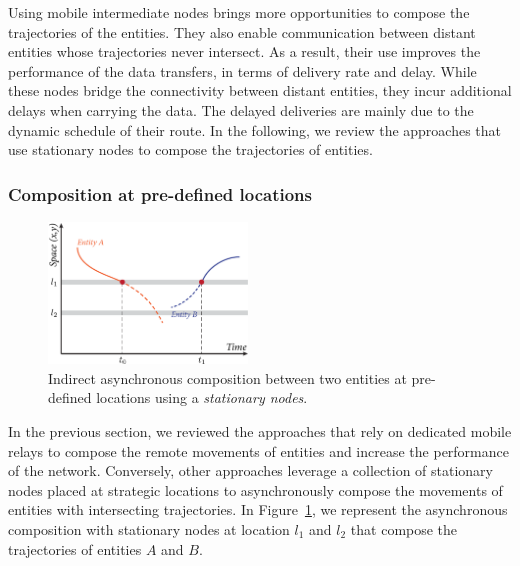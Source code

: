 Using mobile intermediate nodes brings more opportunities to compose the trajectories of the entities. They also enable communication between distant entities whose trajectories never intersect. As a result, their use improves the performance of the data transfers, in terms of delivery rate and delay. While these nodes bridge the connectivity between distant entities, they incur additional delays when carrying the data. The delayed deliveries are mainly due to the dynamic schedule of their route. In the following, we review the approaches that use stationary nodes to compose the trajectories of entities.

\clearpage
\subsubsection{Composition at pre-defined locations}
\label{sec:indirect-async-anchored}

\begin{figure}
    \vspace{-10pt}
    \includegraphics[width=5.3cm]{figures/dtn-indirect-async-geo.pdf}
    \caption{Indirect asynchronous composition between two entities at pre-defined locations using a \textit{stationary nodes}.}
    \label{fig:dtn-indirect-async-geo}
\end{figure}
In the previous section, we reviewed the approaches that rely on dedicated mobile relays to compose the remote movements of entities and increase the performance of the network. Conversely, other approaches leverage a collection of stationary nodes placed at strategic locations to asynchronously compose the movements of entities with intersecting trajectories. In Figure~\ref{fig:dtn-indirect-async-geo}, we represent the asynchronous composition with stationary nodes at location $l_1$ and $l_2$ that compose the trajectories of entities $A$ and $B$.



